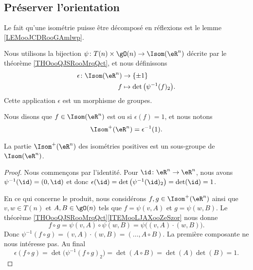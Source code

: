 \subsection{Préserver l'orientation}

Le fait qu'une isométrie puisse être décomposé en réflexions est le lemme \ref{LEMooJCDRooGAmlwp}.

\begin{propositionDef}      \label{DEFooUZFHooXVVLBL}
	Nous utilisons la bijection \( \psi\colon T(n)\times \gO(n)\to \Isom(\eR^n)\) décrite par le théorème \ref{THOooQJSRooMrqQct}, et nous définissons
	\begin{equation}
		\begin{aligned}
			\epsilon\colon \Isom(\eR^n) & \to \{ \pm 1 \}                         \\
			f                           & \mapsto \det\big( \psi^{-1}(f)_2 \big).
		\end{aligned}
	\end{equation}
	Cette application \( \epsilon\) est un morphisme de groupes.

	Nous disons que \( f\in\Isom(\eR^n)\) est  ou  si \( \epsilon(f)=1\), et nous notons
	\begin{equation}
		\Isom^+(\eR^n)=\epsilon^{-1}(1).
	\end{equation}
\end{propositionDef}

\begin{lemma}       \label{LEMooVRELooESIWQl}
	La partie \( \Isom^+(\eR^n)\) des isométries positives est un sous-groupe de \( \Isom(\eR^n)\).
\end{lemma}

\begin{proof}
	Nous commençons par l'identité. Pour \(\id \colon \eR^n\to \eR^n  \), nous avons \( \psi^{-1}(\id)=(0,\id)\) et donc \( \epsilon(\id)=\det\big( \psi^{-1}(\id)_2 \big)=\det(\id)=1\).

	En ce qui concerne le produit, nous considérons \( f,g\in\Isom^+(\eR^n)\) ainsi que \( v,w\in T(n)\) et \( A,B\in \gO(n)\) tels que \( f=\psi(v,A)\) et \( g=\psi(w,B)\). Le théorème \ref{THOooQJSRooMrqQct}\ref{ITEMooLJAXooZeSzor} nous donne
	\begin{equation}
		f\circ g=\psi(v,A)\circ\psi(w,B)=\psi\big( (v,A)\cdot (w,B) \big).
	\end{equation}
	Donc \( \psi^{-1}(f\circ g)=(v,A)\cdot (w,B)=(\ldots, A\circ B)\). La première composante ne nous intéresse pas. Au final
	\begin{equation}
		\epsilon(f\circ g)=\det\big( \psi^{-1}(f\circ g)_2 \big)=\det(A\circ B)=\det(A)\det(B)=1.
	\end{equation}
\end{proof}


